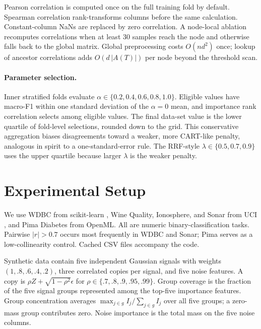 \documentclass[runningheads]{llncs}
\begin{document}
Pearson correlation is computed once on the full training fold by default. Spearman correlation rank-transforms columns before the same calculation. Constant-column NaNs are replaced by zero correlation. A node-local ablation recomputes correlations when at least 30 samples reach the node and otherwise falls back to the global matrix. Global preprocessing costs $O(nd^2)$ once; lookup of ancestor correlations adds $O(d\,|A(T)|)$ per node beyond the threshold scan.

\paragraph{Parameter selection.} Inner stratified folds evaluate $\alpha\in\{0.2,0.4,0.6,0.8,1.0\}$. Eligible values have macro-F1 within one standard deviation of the $\alpha=0$ mean, and importance rank correlation selects among eligible values. The final data-set value is the lower quartile of fold-level selections, rounded down to the grid. This conservative aggregation biases disagreements toward a weaker, more CART-like penalty, analogous in spirit to a one-standard-error rule. The RRF-style $\lambda\in\{0.5,0.7,0.9\}$ uses the upper quartile because larger $\lambda$ is the weaker penalty.

\section{Experimental Setup}
We use WDBC from scikit-learn \cite{pedregosa2011sklearn}, Wine Quality, Ionosphere, and Sonar from UCI \cite{uci2024}, and Pima Diabetes from OpenML. All are numeric binary-classification tasks. Pairwise $|r|>0.7$ occurs most frequently in WDBC and Sonar; Pima serves as a low-collinearity control. Cached CSV files accompany the code.

\begin{table}[t]\centering\caption{Data-set statistics and collinearity diagnostics.}\label{tab:data}\scriptsize\end{table}

Synthetic data contain five independent Gaussian signals with weights $(1,.8,.6,.4,.2)$, three correlated copies per signal, and five noise features. A copy is $\rho Z+\sqrt{1-\rho^2}\epsilon$ for $\rho\in\{.7,.8,.9,.95,.99\}$. Group coverage is the fraction of the five signal groups represented among the top-five importance features. Group concentration averages $\max_{j\in g}I_j/\sum_{j\in g}I_j$ over all five groups; a zero-mass group contributes zero. Noise importance is the total mass on the five noise columns.
\end{document}
